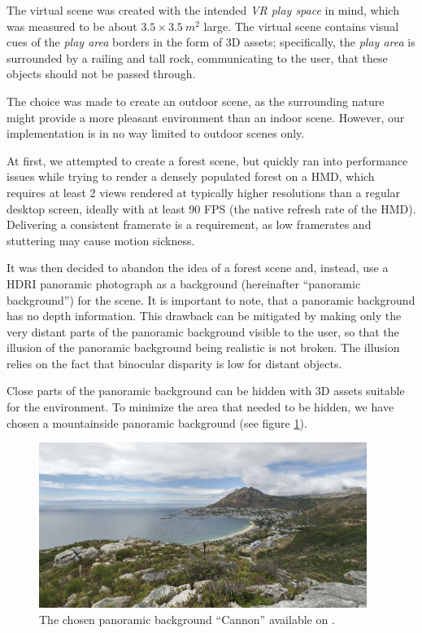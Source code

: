 The virtual scene was created with the intended \textit{\ac{VR} play space} in mind, which was measured to be about $3.5\times3.5 \:\si{m^2}$ large. The virtual scene contains visual cues of the \textit{play area} borders in the form of 3D assets; specifically, the \textit{play area} is surrounded by a railing and tall rock, communicating to the user, that these objects should not be passed through.

The choice was made to create an outdoor scene, as the surrounding nature might provide a more pleasant environment than an indoor scene. However, our implementation is in no way limited to outdoor scenes only.

At first, we attempted to create a forest scene, but quickly ran into performance issues while trying to render a densely populated forest on a \ac{HMD}, which requires at least 2 views rendered at typically higher resolutions than a regular desktop screen, ideally with at least 90 \acs{FPS} (the native refresh rate of the \ac{HMD}). Delivering a consistent framerate is a requirement, as low framerates and stuttering may cause motion sickness.

It was then decided to abandon the idea of a forest scene and, instead, use a \ac{HDRI} panoramic photograph as a background (hereinafter ``panoramic background'') for the scene. It is important to note, that a panoramic background has no depth information. This drawback can be mitigated by making only the very distant parts of the panoramic background visible to the user, so that the illusion of the panoramic background being realistic is not broken. The illusion relies on the fact that binocular disparity is low for distant objects.

Close parts of the panoramic background can be hidden with 3D assets suitable for the environment. To minimize the area that needed to be hidden, we have chosen a mountainside panoramic background (see figure \ref{fig:cannon}).

\begin{figure}[H]
    \centering
    \ifgraphics
        \includegraphics[width=0.95\textwidth]{img/cannon.png}
    \fi
    \caption{The chosen panoramic background ``Cannon'' available on .}\label{fig:cannon}
\end{figure}

